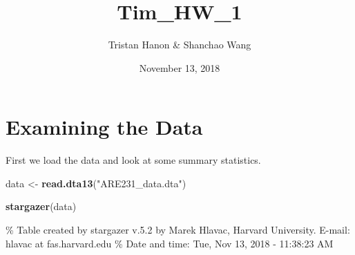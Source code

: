 \documentclass[]{article}
\title{Tim\_HW\_1}
\author{Tristan Hanon \& Shanchao Wang}
\date{November 13, 2018}
\newenvironment{Shaded}{\begin{snugshade}}{\end{snugshade}}
\newcommand{\KeywordTok}[1]{\textcolor[rgb]{0.13,0.29,0.53}{\textbf{#1}}}
\newcommand{\StringTok}[1]{\textcolor[rgb]{0.31,0.60,0.02}{#1}}
\newcommand{\NormalTok}[1]{#1}
\begin{document}
\maketitle

\section{Examining the Data}

First we load the data and look at some summary statistics.

\begin{Shaded}
\begin{Highlighting}[]
\NormalTok{data <-}\StringTok{ }\KeywordTok{read.dta13}\NormalTok{(}\StringTok{"ARE231_data.dta"}\NormalTok{)}

\KeywordTok{stargazer}\NormalTok{(data)}
\end{Highlighting}
\end{Shaded}

\% Table created by stargazer v.5.2 by Marek Hlavac, Harvard University.
E-mail: hlavac at fas.harvard.edu \% Date and time: Tue, Nov 13, 2018 -
11:38:23 AM
\end{document}
